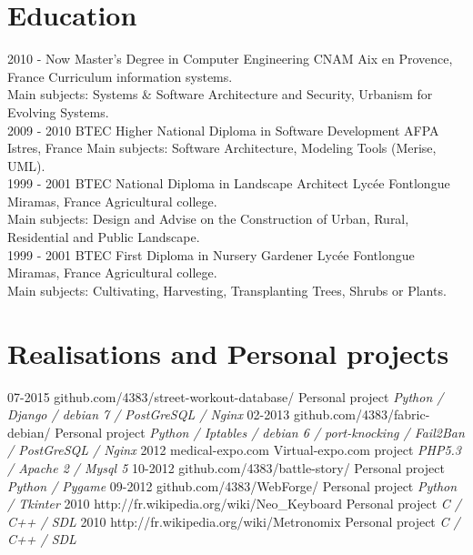 \documentclass[]{friggeri-cv}
\begin{document}
\section{Education}
\begin{entrylist}
  \entry
    {2010 - Now}
    {Master's Degree in Computer Engineering}
    {CNAM Aix en Provence, France}
    {Curriculum information systems.\\
    Main subjects: Systems \& Software Architecture and Security, Urbanism for Evolving Systems.\\}
  \entry
    {2009 - 2010}
    {BTEC Higher National Diploma in Software Development}
    {AFPA Istres, France}
    {Main subjects: Software Architecture, Modeling Tools (Merise, UML).\\}
  \entry
    {1999 - 2001}
    {BTEC National Diploma in Landscape Architect}
    {Lycée Fontlongue Miramas, France}
    {Agricultural college.\\
    Main subjects: Design and Advise on the Construction of Urban, Rural, Residential and Public Landscape.\\}
  \entry
    {1999 - 2001}
    {BTEC First Diploma in Nursery Gardener}
    {Lycée Fontlongue Miramas, France}
    {Agricultural college.\\
    Main subjects: Cultivating, Harvesting, Transplanting Trees, Shrubs or Plants.}
\end{entrylist}

\section{Realisations and Personal projects}
\begin{entrylist}
  \entry
    {07-2015}
    {github.com/4383/street-workout-database/}
    {Personal project}
    {\emph{Python / Django / debian 7 / PostGreSQL / Nginx}}
  \entry
    {02-2013}
    {github.com/4383/fabric-debian/}
    {Personal project}
    {\emph{Python / Iptables /  debian 6 / port-knocking / Fail2Ban / PostGreSQL / Nginx}}
  \entry
    {2012}
    {medical-expo.com}
    {Virtual-expo.com project}
    {\emph{PHP5.3 / Apache 2 / Mysql 5}}
  \entry
    {10-2012}
    {github.com/4383/battle-story/}
    {Personal project}
    {\emph{Python / Pygame}}
  \entry
    {09-2012}
    {github.com/4383/WebForge/}
    {Personal project}
    {\emph{Python / Tkinter}}
  \entry
    {2010}
    {http://fr.wikipedia.org/wiki/Neo\_Keyboard}
    {Personal project}
    {\emph{C / C++ / SDL}}
  \entry
    {2010}
    {http://fr.wikipedia.org/wiki/Metronomix}
    {Personal project}
    {\emph{C / C++ / SDL}}
\end{entrylist}
\end{document}
